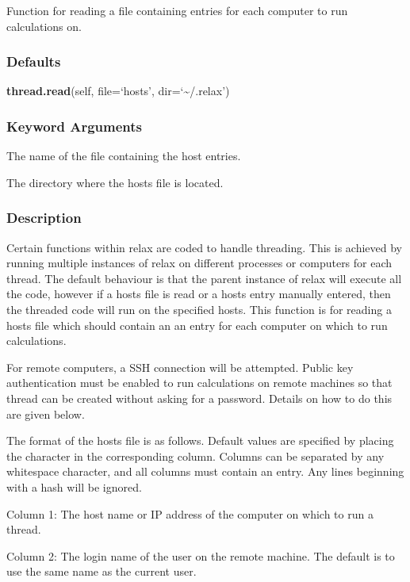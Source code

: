 Function for reading a file containing entries for each computer to run calculations on.

\subsubsection{Defaults}

\textsf{\textbf{thread.read}(self, file=`hosts', dir=`\~{}/.relax')}


\subsubsection{Keyword Arguments}


  The name of the file containing the host entries.

  The directory where the hosts file is located.

\subsubsection{Description}

Certain functions within relax are coded to handle threading.  This is achieved by running
multiple instances of relax on different processes or computers for each thread.  The
default behaviour is that the parent instance of relax will execute all the code, however if
a hosts file is read  or a hosts entry manually entered, then the threaded code will run on
the specified hosts.  This function is for reading  a hosts file which should contain an
an entry for each computer on which to run calculations.

For remote computers, a SSH connection will be attempted.  Public key authentication must be
enabled to run calculations on remote machines so that thread can be created without asking
for a password.  Details on how to do this are given below.


The format of the hosts file is as follows.  Default values are specified by placing the
character 
 in the corresponding column.  Columns can be separated by any whitespace
character, and all columns must contain an entry.  Any lines beginning with a hash will be
ignored.

Column 1:  The host name or IP address of the computer on which to run a thread.

Column 2:  The login name of the user on the remote machine.  The default is to use the same
name as the current user.

